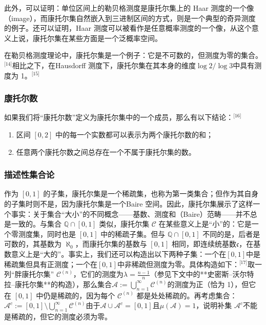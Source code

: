 此外，可以证明：单位区间上的勒贝格测度是康托尔集上的 Haar 测度的一个像（image），而康托尔集自然嵌入到三进制区间的方式，则是一个典型的奇异测度的例子。还可以证明，Haar 测度可以被看作是任意概率测度的一个像，从这个意义上说，康托尔集在某些方面是一个泛概率空间。

在勒贝格测度理论中，康托尔集是一个例子：它是不可数的，但测度为零的集合。\(^\text{[14]}\)相比之下，在Hausdorff 测度下，康托尔集在其本身的维度$\log 2 / \log 3$中具有测度为 1。\(^\text{[15]}\)
\subsubsection{康托尔数}
如果我们将“康托尔数”定义为康托尔集中的一个成员，那么有以下结论：\(^\text{[16]}\)
\begin{enumerate}
\item 区间 $[0, 2]$ 中的每一个实数都可以表示为两个康托尔数的和；
\item 任意两个康托尔数之间总存在一个不属于康托尔集的数。
\end{enumerate}
\subsubsection{描述性集合论}
作为 $[0,1]$ 的子集，康托尔集是一个稀疏集，也称为第一类集合；但作为其自身的子集时则不是，因为康托尔集是一个Baire 空间。因此，康托尔集展示了这样一个事实：关于集合“大小”的不同概念——基数、测度和（Baire）范畴——并不总是一致的。与集合 $\mathbb{Q} \cap [0,1]$ 类似，康托尔集 $\mathcal{C}$ 在某些意义上是“小”的：它是一个零测度集，同时也是 $[0,1]$ 中的稀疏子集。但与 $\mathbb{Q} \cap [0,1]$ 不同的是，后者是可数的，其基数为 $\aleph_0$，而康托尔集的基数与 $[0,1]$ 相同，即连续统基数$\mathfrak{c}$，在基数意义上是“大的”。事实上，我们还可以构造出以下两种子集：一个在$[0,1]$中是稀疏集但具有正测度；一个在$[0,1]$中非稀疏但测度为零。具体构造如下：\(^\text{[17]}\)取一列“胖康托尔集” $\mathcal{C}^{(n)}$，它们的测度为$\lambda = \frac{n - 1}{n}$（参见下文中的**史密斯–沃尔特拉–康托尔集**的构造），那么集合$\mathcal{A} := \bigcup_{n=1}^{\infty} \mathcal{C}^{(n)}$的测度为正（恰为 1），但它在 $[0,1]$ 中仍是稀疏的，因为每个 $\mathcal{C}^{(n)}$ 都是处处稀疏的。再考虑集合：$\mathcal{A}^c := [0,1] \setminus \bigcup_{n=1}^{\infty} \mathcal{C}^{(n)}$由于$\mathcal{A} \cup \mathcal{A}^c = [0,1]$且$\mu(\mathcal{A}) = 1$，说明补集 $\mathcal{A}^c$不能是稀疏的，但它的测度必须为零。

